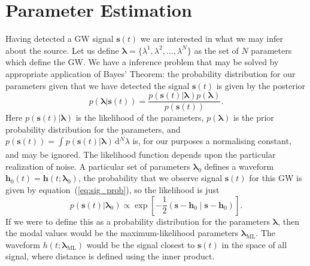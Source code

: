 \documentclass[a4paper, 11pt, titlepage, twoside]{report}
\newcommand{\eqnref}[1]{equation~(\ref{eq:#1})}
\newcommand{\sub}[1]{\ensuremath{_\mathrm{#1}}}
\newcommand{\recip}[1]{\ensuremath{\frac{1}{#1}}}
\newcommand{\innerprod}[2]{\ensuremath{\left({#1}\middle|{#2}\right)}}
\newcommand{\dd}{\ensuremath{\mathrm{d}}}
\newcommand{\intd}[4]{\ensuremath{\int_{#1}^{#2}{#3}\,\dd{#4}}}
\begin{document}
\section{Parameter Estimation}

Having detected a GW signal $\boldsymbol{s}(t)$ we are interested in what we may infer about the source. Let us define $\boldsymbol{\lambda} = \{\lambda^1, \lambda^2, \ldots, \lambda^N\}$ as the set of $N$ parameters which define the GW. We have a inference problem that may be solved by appropriate application of Bayes' Theorem\cite{Jaynes2003}: the probability distribution for our parameters given that we have detected the signal $\boldsymbol{s}(t)$ is given by the posterior
\begin{equation}
p(\boldsymbol{\lambda}|\boldsymbol{s}(t)) = \frac{p(\boldsymbol{s}(t)|\boldsymbol{\lambda})p(\boldsymbol{\lambda})}{p(\boldsymbol{s}(t))}.
\end{equation}
Here $p(\boldsymbol{s}(t)|\boldsymbol{\lambda})$ is the likelihood of the parameters, $p(\boldsymbol{\lambda})$ is the prior probability distribution for the parameters, and $p(\boldsymbol{s}(t)) = \intd{}{}{p(\boldsymbol{s}(t)|\boldsymbol{\lambda})}{^N \lambda}$ is, for our purposes a normalising constant, and may be ignored. The likelihood function depends upon the particular realization of noise. A particular set of parameters $\boldsymbol{\lambda}_0$ defines a waveform $\boldsymbol{h}_0(t) = \boldsymbol{h}(t; \boldsymbol{\lambda}_0)$, the probability that we observe signal $\boldsymbol{s}(t)$ for this GW is given by \eqnref{sig_prob}, so the likelihood is just
\begin{equation}
p(\boldsymbol{s}(t)|\boldsymbol{\lambda}_0) \propto \exp\left[-\recip{2}\innerprod{\boldsymbol{s}-\boldsymbol{h}_0}{\boldsymbol{s}-\boldsymbol{h}_0}\right].
\end{equation}
If we were to define this as a probability distribution for the parameters $\boldsymbol{\lambda}$, then the modal values would be the maximum-likelihood parameters $\boldsymbol{\lambda}\sub{ML}$. The waveform $h(t; \boldsymbol{\lambda}\sub{ML})$ would be the signal closest to $\boldsymbol{s}(t)$ in the space of all signal, where distance is defined using the inner product\cite{Cutler1994}.
\end{document}
